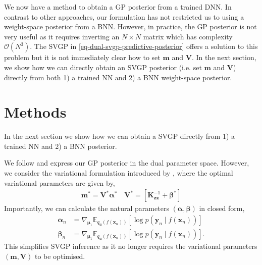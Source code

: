 \documentclass{article}
\newcommand{\inducingVariable}{\ensuremath{\mathbf{u}}}
\newcommand{\meanParam}[1]{\ensuremath{\bm{\mu}_{#1}}}
\newcommand{\transitionParams}{\ensuremath{\mathbf{w}}}
\begin{document}
We now have a method to obtain a GP posterior from a trained DNN.
In contrast to other approaches, our formulation has not restricted us to using a weight-space posterior from a BNN.
However, in practice, the GP posterior is not very useful as it requires inverting an $N\times N$ matrix which has complexity $\mathcal{O}(N^{3})$.
The SVGP in \cref{eq-dual-svgp-predictive-posterior} offers a solution to this problem but it is not immediately clear how to set $\mathbf{m}$ and $\mathbf{V}$.
In the next section, we show how we can directly obtain an SVGP posterior (i.e. set $\mathbf{m}$ and $\mathbf{V}$) directly from both
1) a trained NN and 2) a BNN weight-space posterior.





\section{Methods}
In the next section we show how we can obtain a SVGP directly from 1) a trained NN and 2) a BNN posterior.

We follow \cite{csatoSparseOnlineGaussian2002} and express our GP posterior in the dual parameter space.
However, we consider the variational formulation introduced by \cite{adamDualParameterizationSparse2021}, where the optimal variational parameters are given by,
\begin{align} \label{eq-dual-params}
\mathbf{m}^{*} = \mathbf{V}^{*}\bm\alpha^{*} \quad \mathbf{V}^{*} = [\mathbf{K}_{\mathbf{z}\mathbf{z}}^{-1} + \bm\beta^{*}]
\end{align}
Importantly, we can calculate the natural parameters $(\bm\alpha, \bm\beta)$ in closed form,
\begin{align} \label{eq-dual-svgp-params}
\bm\alpha_{n} &=  \nabla_{\meanParam{1}} \mathbb{E}_{q_{\inducingVariable}(f(\mathbf{x}_{n}))} \left[ \log p(\mathbf{y}_{n} \mid f(\mathbf{x}_{n}) ) \right] \\
\bm\beta_{n} &=  \nabla_{\meanParam{1}} \mathbb{E}_{q_{\inducingVariable}(f(\mathbf{x}_{n}))} \left[ \log p(\mathbf{y}_{n} \mid f(\mathbf{x}_{n}) ) \right].
\end{align}
This simplifies SVGP inference \citep{hensmanGaussian2013} as it no longer requires the variational parameters $(\mathbf{m}, \mathbf{V})$ to be optimised.
\end{document}
